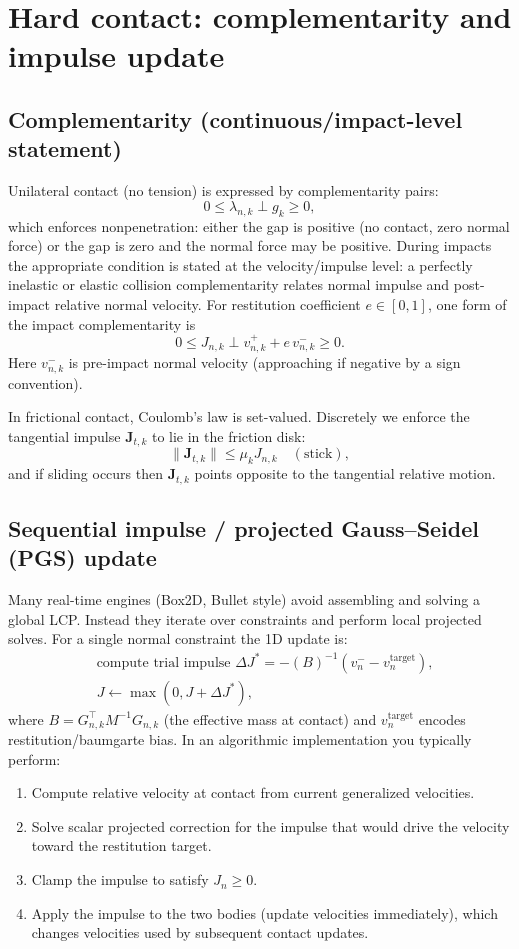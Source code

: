 \documentclass[11pt,a4paper]{article}
\begin{document}
\section{Hard contact: complementarity and impulse update}
\subsection{Complementarity (continuous/impact-level statement)}
Unilateral contact (no tension) is expressed by complementarity pairs:
\[ 0 \le \lambda_{n,k} \perp g_k \ge 0, \]
which enforces nonpenetration: either the gap is positive (no contact, zero normal force) or the gap is zero and the normal force may be positive. During impacts the appropriate condition is stated at the velocity/impulse level: a perfectly inelastic or elastic collision complementarity relates normal impulse and post-impact relative normal velocity. For restitution coefficient $e\in[0,1]$, one form of the impact complementarity is
\[ 0 \le J_{n,k} \perp v_{n,k}^+ + e\, v_{n,k}^- \ge 0. \]
Here $v^-_{n,k}$ is pre-impact normal velocity (approaching if negative by a sign convention).

In frictional contact, Coulomb's law is set-valued. Discretely we enforce the tangential impulse $\mathbf{J}_{t,k}$ to lie in the friction disk:
\[ \|\mathbf{J}_{t,k}\| \le \mu_k J_{n,k} \quad (\text{stick}),\]
and if sliding occurs then $\mathbf{J}_{t,k}$ points opposite to the tangential relative motion.

\subsection{Sequential impulse / projected Gauss--Seidel (PGS) update}
Many real-time engines (Box2D, Bullet style) avoid assembling and solving a global LCP. Instead they iterate over constraints and perform local projected solves. For a single normal constraint the 1D update is:
\begin{align*}
  &\text{compute trial impulse } \Delta J^* = - (B)^{-1} (v_n^- - v_{n}^{\text{target}}), \\[4pt]
  &J \leftarrow \max(0, J + \Delta J^*),
\end{align*}
where $B = G_{n,k}^\top M^{-1} G_{n,k}$ (the effective mass at contact) and $v_n^{\text{target}}$ encodes restitution/baumgarte bias. In an algorithmic implementation you typically perform:
\begin{enumerate}
  \item Compute relative velocity at contact from current generalized velocities.
  \item Solve scalar projected correction for the impulse that would drive the velocity toward the restitution target.
  \item Clamp the impulse to satisfy $J_n\ge0$.
  \item Apply the impulse to the two bodies (update velocities immediately), which changes velocities used by subsequent contact updates.
\end{enumerate}
\end{document}
